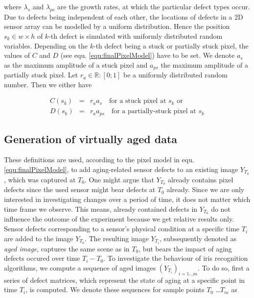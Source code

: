 \documentclass[10pt,twocolumn,letterpaper]{article}
\begin{document}
where $\lambda_s$ and $\lambda_{ps}$ are the growth rates, at which the particular defect types occur. Due to defects being independent of each other, the locations of defects in a 2D sensor array can be modelled by a uniform distribution. Hence the position  $s_k \in {w \times h}$ of $k$-th defect is simulated with uniformly distributed random variables. Depending on the $k$-th defect being a stuck or partially stuck pixel, the values of $C$ and $D$ (see equ. \ref{equ:finalPixelModel}) have to be set. We denote $a_s$ as the maximum amplitude of a stuck pixel and $a_{ps}$ the maximum amplitude of a partially stuck pixel. Let $r_a \in \mathbb{R}:[0;1]$ be a uniformly distributed random number. Then we either have

\begin{eqnarray}
   C({s_k})  & = & r_a  a_s \quad \text{for a stuck pixel at } s_k \text{ or} \label{equ:stucks} \\
   D({s_k}) & = &  r_a a_{ps} \quad \text{for a partially-stuck pixel at } s_k \label{equ:partiallyStuck}
\end{eqnarray}


\subsection{Generation of virtually aged data}
These definitions are used, according to the pixel model in equ. \ref{equ:finalPixelModel}, to add aging-related sensor defects to an existing image $Y_{T_0}$, which was captured at ${T_0}$. One might argue that $Y_{T_0}$ already contains pixel defects since the used sensor might bear defects at $T_0$ already. Since we are only interested in investigating changes over a period of time, it does not matter which time frame we observe. This means, already contained defects in $Y_{T_0}$ do not influence the outcome of the experiment because we get relative results only. Sensor defects corresponding to a sensor's physical condition at a specific time $T_i$ are added to the image $Y_{T_0}$. The resulting image $Y_{T_i}$, subsequently denoted as \emph{aged image}, captures the same scene as in $T_0$, but bears the impact of aging defects occured over time ${T_i} - {T_0}$. To investigate the behaviour of iris recognition algorithms, we compute a sequence of aged images $(Y_{T_i})_{i=1 \dots m}$. To do so, first a series of defect matrices, which represent the state of aging at a specific point in time $T_i$, is computed. We denote these sequences for sample points $T_0$ \dots $T_m$ as
\end{document}
